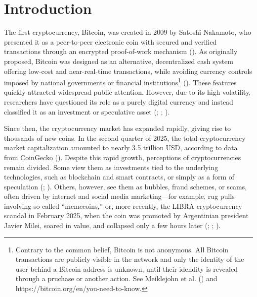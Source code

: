 \documentclass[
  12pt,
  a4paper,
  openany]{scrbook}
\begin{document}
\let\mainmatter\mainmatterreal
\mainmatter



\chapter{Introduction}\label{introduction}

The first cryptocurrency, Bitcoin, was created in 2009 by Satoshi
Nakamoto, who presented it as a peer-to-peer electronic coin with
secured and verified transactions through an encrypted proof-of-work
mechanism (). As
originally proposed, Bitcoin was designed as an alternative,
decentralized cash system offering low-cost and near-real-time
transactions, while avoiding currency controls imposed by national
governments or financial institutions\footnote{Contrary to the common
  belief, Bitcoin is not anonymous. All Bitcoin transactions are
  publicly visible in the network and only the identity of the user
  behind a Bitcoin address is unknown, until their idendity is revealed
  through a pruchase or another action. See Meiklejohn et al.
  () and
  https://bitcoin.org/en/you-need-to-know.}
(). These features
quickly attracted widespread public attention. However, due to its high
volatility, researchers have questioned its role as a purely digital
currency and instead classified it as an investment or speculative asset
(;
;
).

Since then, the cryptocurrency market has expanded rapidly, giving rise
to thousands of new coins. In the second quarter of 2025, the total
cryptocurrency market capitalization amounted to nearly 3.5 trillion
USD, according to data from CoinGecko
(). Despite this rapid growth,
perceptions of cryptocurrencies remain divided. Some view them as
investments tied to the underlying technologies, such as blockchain and
smart contracts, or simply as a form of speculation
(;
).
Others, however, see them as bubbles, fraud schemes, or scams, often
driven by internet and social media marketing---for example, rug pulls
involving so-called ``memecoins,'' or, more recently, the LIBRA
cryptocurrency scandal in February 2025, when the coin was promoted by
Argentinian president Javier Milei, soared in value, and collapsed only
a few hours later (; ; ).
\end{document}
